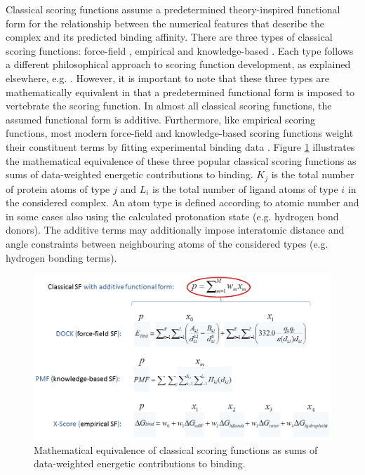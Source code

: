 Classical scoring functions assume a predetermined theory-inspired functional form for the relationship between the numerical features that describe the complex and its predicted binding affinity. There are three types of classical scoring functions: force-field \citep{1461,1462,959}, empirical \citep{1463,1464,1465,1466} and knowledge-based \citep{1467,1468,1469,1470}. Each type follows a different philosophical approach to scoring function development, as explained elsewhere, e.g. \citep{579}. However, it is important to note that these three types are mathematically equivalent in that a predetermined functional form is imposed to vertebrate the scoring function. In almost all classical scoring functions, the assumed functional form is additive. Furthermore, like empirical scoring functions, most modern force-field and knowledge-based scoring functions weight their constituent terms by fitting experimental binding data \citep{579}. Figure \ref{rfscore3:ClassicalScoringFunctions} illustrates the mathematical equivalence of these three popular classical scoring functions as sums of data-weighted energetic contributions to binding. $K_j$ is the total number of protein atoms of type $j$ and $L_i$ is the total number of ligand atoms of type $i$ in the considered complex. An atom type is defined according to atomic number and in some cases also using the calculated protonation state (e.g. hydrogen bond donors). The additive terms may additionally impose interatomic distance and angle constraints between neighbouring atoms of the considered types (e.g. hydrogen bonding terms).

\begin{figure}
\centering
\includegraphics[width=\linewidth]{../rfscore3/ClassicalScoringFunctions.png}
\caption{Mathematical equivalence of classical scoring functions as sums of data-weighted energetic contributions to binding.}
\label{rfscore3:ClassicalScoringFunctions}
\end{figure}

